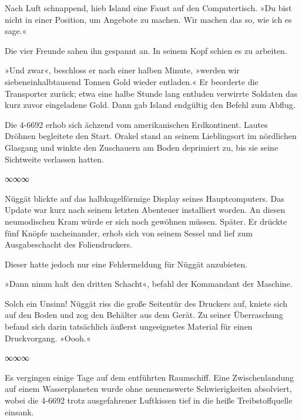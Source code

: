 Nach Luft schnappend, hieb Island eine Faust auf den Computertisch. »Du bist nicht in einer Position, um Angebote zu machen. Wir machen das so, wie ich es sage.«

Die vier Freunde sahen ihn gespannt an. In seinem Kopf schien es zu arbeiten.

»Und zwar«, beschloss er nach einer halben Minute, »werden wir siebeneinhalbtausend Tonnen Gold wieder entladen.« Er beorderte die Transporter zurück; etwa eine halbe Stunde lang entluden verwirrte Soldaten das kurz zuvor eingeladene Gold. Dann gab Island endgültig den Befehl zum Abflug.

Die 4-6692 erhob sich ächzend vom amerikanischen Erdkontinent. Lautes Dröhnen begleitete den Start. Orakel stand an seinem Lieblingsort im nördlichen Glasgang und winkte den Zuschauern am Boden deprimiert zu, bis sie seine Sichtweite verlassen hatten.

\begin{center}
∞∞∞
\end{center}

Nüggät blickte auf das halbkugelförmige Display seines Hauptcomputers. Das Update war kurz nach seinem letzten Abenteuer installiert worden. An diesen neumodischen Kram würde er sich noch gewöhnen müssen. Später. Er drückte fünf Knöpfe nacheinander, erhob sich von seinem Sessel und lief zum Ausgabeschacht des Foliendruckers.

Dieser hatte jedoch nur eine Fehlermeldung für Nüggät anzubieten. 

»Dann nimm halt den dritten Schacht«, befahl der Kommandant der Maschine.


Solch ein Unsinn! Nüggät riss die große Seitentür des Druckers auf, kniete sich auf den Boden und zog den Behälter aus dem Gerät. Zu seiner Überraschung befand sich darin tatsächlich äußerst ungeeignetes Material für einen Druckvorgang. »Oooh.«

\begin{center}
∞∞∞
\end{center}

Es vergingen einige Tage auf dem entführten Raumschiff. Eine Zwischenlandung auf einem Wasserplaneten wurde ohne nennenswerte Schwierigkeiten absolviert, wobei die 4-6692 trotz ausgefahrener Luftkissen tief in die heiße Treibstoffquelle einsank.

